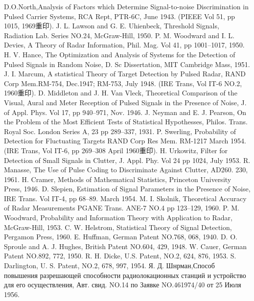 \begin{references}
     {}D.O.North,Analysis of Factors which Determine Signal-to-noise Discrimination in Pulsed Carrier Systems, RCA Rept, PTR-6C, June 1943. (PIEEE Vol 51, pp 1015, 1969重印).
     J. L. Lawson and G. E. Uhienbeck, Threshold Signals, Radiation Lab. Series NO.24, McGraw-Hill, 1950.
     P. M. Woodward and I. L. Devies, A Theory of Radar Information, Phil. Mag. Vol 41, pp 1001--1017, 1950.
     H. V. Hance, The Optimization and Analysis of Systems for the Detection of Pulsed Signals in Random Noise, D. Sc Dissertation, MIT Cambridge Mass, 1951.
     J. I. Marcum, A statistical Theory of Target Detection by Pulsed Radar, RAND Corp Mem.RM-754, Dec.1947; RM-753, July 1948. (IRE Trans, Vol IT-6 NO.2, 1960重印).
     D. Middleton and J. H. Van Vleck, Theoretical Comparison of the Visual, Aural and Meter Reception of Pulsed Signals in the Presence of Noise, J. of Appl. Phys. Vol 17, pp 940--971, Nov. 1946.
     J. Neyman and E. J. Pearson, On the Problem of the Most Efficient Tests of Statistical Hypothesses, Philos. Trans. Royal Soc. London Series A, 23 pp 289--337, 1931.
     P. Swerling, Probability of Detection for Fluctuating Targets RAND Corp Res Mem. RM-1217 March 1954.(IRE Trans, Vol IT-6, pp 269--308 April 1960重印).
     H. Urkowitz, Filter for Detection of Small Signals in Clutter, J. Appl. Phy. Vol 24 pp 1024, July 1953.
     R. Manasse, The Use of Pulse Coding to Discriminate Against Clutter, AD260. 230, 1961.
     H. Cramer, Methods of Mathematical Statistics, Princeton University Press, 1946.
     D. Slepien, Estimation of Signal Parameters in the Presence of Noise, IRE Trans. Vol IT-4, pp 68--89. March 1954.
     M. I. Skolnik, Theoretical Accuracy of Radar Measurements PGANE Trans. ANE-7 NO.4 pp 123--129, 1960.
     P. M. Woodward, Probability and Information Theory with Application to Radar, McGraw-Hill, 1953.
     C. W. Helstrom, Statistical Theory of Signal Detection, Pergamon Press, 1960.
     E. Huffman, German Patent NO.768, 068, 1940.
     D. O. Sproule and A. J. Hughes, British Patent NO.604, 429, 1948.
     W. Cauer, German Patent NO.892, 772, 1950.
     R. H. Dicke, U.S. Patent, NO.2, 624, 876, 1953.
     S. Darlington, U. S. Patent, NO.2, 678, 997, 1954.
     Я. Д. Шнрман,Способ повышения разрешающей способности радиолока\-ционных станций и устройство для его осуществления, Авт. свид. NO.14 по Заявке NO.461974/40 от 25 Июля 1956.

\end{references}

